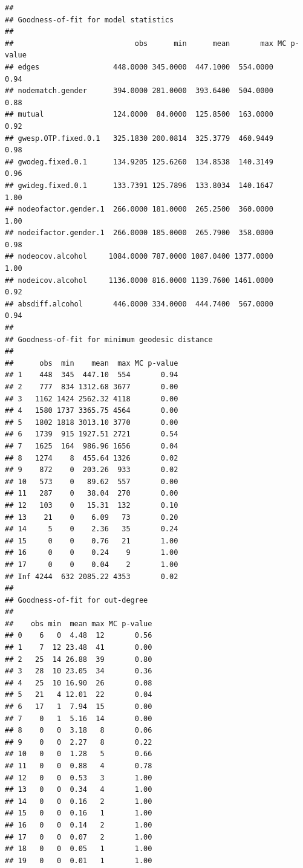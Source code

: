 \documentclass[
]{article}
\begin{document}
\begin{verbatim}
## 
## Goodness-of-fit for model statistics 
## 
##                            obs      min      mean       max MC p-value
## edges                 448.0000 345.0000  447.1000  554.0000       0.94
## nodematch.gender      394.0000 281.0000  393.6400  504.0000       0.88
## mutual                124.0000  84.0000  125.8500  163.0000       0.92
## gwesp.OTP.fixed.0.1   325.1830 200.0814  325.3779  460.9449       0.98
## gwodeg.fixed.0.1      134.9205 125.6260  134.8538  140.3149       0.96
## gwideg.fixed.0.1      133.7391 125.7896  133.8034  140.1647       1.00
## nodeofactor.gender.1  266.0000 181.0000  265.2500  360.0000       1.00
## nodeifactor.gender.1  266.0000 185.0000  265.7900  358.0000       0.98
## nodeocov.alcohol     1084.0000 787.0000 1087.0400 1377.0000       1.00
## nodeicov.alcohol     1136.0000 816.0000 1139.7600 1461.0000       0.92
## absdiff.alcohol       446.0000 334.0000  444.7400  567.0000       0.94
## 
## Goodness-of-fit for minimum geodesic distance 
## 
##      obs  min    mean  max MC p-value
## 1    448  345  447.10  554       0.94
## 2    777  834 1312.68 3677       0.00
## 3   1162 1424 2562.32 4118       0.00
## 4   1580 1737 3365.75 4564       0.00
## 5   1802 1818 3013.10 3770       0.00
## 6   1739  915 1927.51 2721       0.54
## 7   1625  164  986.96 1656       0.04
## 8   1274    8  455.64 1326       0.02
## 9    872    0  203.26  933       0.02
## 10   573    0   89.62  557       0.00
## 11   287    0   38.04  270       0.00
## 12   103    0   15.31  132       0.10
## 13    21    0    6.09   73       0.20
## 14     5    0    2.36   35       0.24
## 15     0    0    0.76   21       1.00
## 16     0    0    0.24    9       1.00
## 17     0    0    0.04    2       1.00
## Inf 4244  632 2085.22 4353       0.02
## 
## Goodness-of-fit for out-degree 
## 
##    obs min  mean max MC p-value
## 0    6   0  4.48  12       0.56
## 1    7  12 23.48  41       0.00
## 2   25  14 26.88  39       0.80
## 3   28  10 23.05  34       0.36
## 4   25  10 16.90  26       0.08
## 5   21   4 12.01  22       0.04
## 6   17   1  7.94  15       0.00
## 7    0   1  5.16  14       0.00
## 8    0   0  3.18   8       0.06
## 9    0   0  2.27   8       0.22
## 10   0   0  1.28   5       0.66
## 11   0   0  0.88   4       0.78
## 12   0   0  0.53   3       1.00
## 13   0   0  0.34   4       1.00
## 14   0   0  0.16   2       1.00
## 15   0   0  0.16   1       1.00
## 16   0   0  0.14   2       1.00
## 17   0   0  0.07   2       1.00
## 18   0   0  0.05   1       1.00
## 19   0   0  0.01   1       1.00

\end{verbatim}
\end{document}
